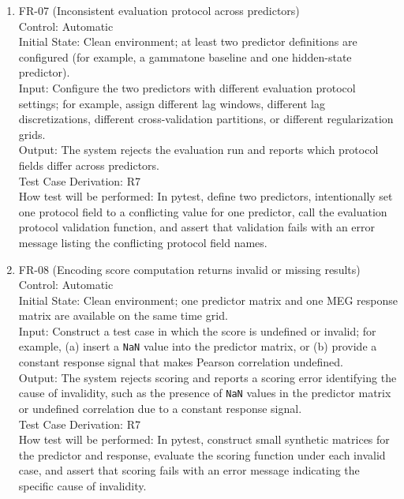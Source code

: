 \documentclass[12pt, titlepage]{article}
\begin{document}
\begin{enumerate}
\item{FR-07 (Inconsistent evaluation protocol across predictors)\\}
Control: Automatic \\
Initial State: Clean environment; at least two predictor definitions are
configured (for example, a gammatone baseline and one hidden-state predictor). \\
Input: Configure the two predictors with different evaluation protocol settings;
for example, assign different lag windows, different lag discretizations,
different cross-validation partitions, or different regularization grids. \\
Output: The system rejects the evaluation run and reports which protocol fields differ across predictors. \\
Test Case Derivation: R7 \\
How test will be performed: In pytest, define two predictors, intentionally set one protocol field to a conflicting value for one predictor, call the evaluation protocol validation function, and assert that validation fails with an error message listing the conflicting protocol field names.



\item{FR-08 (Encoding score computation returns invalid or missing results)\\}
Control: Automatic \\
Initial State: Clean environment; one predictor matrix and one MEG response
matrix are available on the same time grid. \\
Input: Construct a test case in which the score is undefined or invalid; for example, (a) insert a \texttt{NaN} value into the predictor matrix, or (b) provide a constant response signal that makes Pearson correlation undefined. \\
Output: The system rejects scoring and reports a scoring error identifying the cause of invalidity, such as the presence of \texttt{NaN} values in the predictor matrix or undefined correlation due to a constant response signal. \\
Test Case Derivation: R7 \\
How test will be performed: In pytest, construct small synthetic matrices for the predictor and response, evaluate the scoring function under each invalid case, and assert that scoring fails with an error message indicating the specific cause of invalidity.





\end{enumerate}
\end{document}
